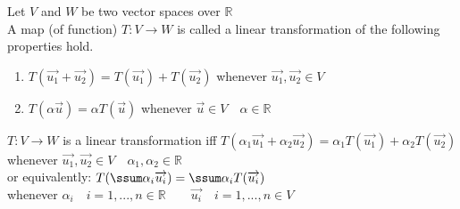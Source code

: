 \documentclass[12pt]{article}
\renewcommand{\v}[1]{\overrightarrow{#1}}
\newcommand{\real}[0]{\mathbb{R}}
\newenvironment{remark}{\block[Remark]}{\endblock}
\newenvironment{definition}{\block[Definition]}{\endblock}
\begin{document}
\begin{definition}
	Let $V$ and $W$ be two vector spaces over $\real$ \\
	A map (of function) $T: V \rightarrow W$ is called a linear transformation of the following properties hold.
	
	\begin{enumerate}
		\item $T(\v{u_1} + \v{u_2}) = T(\v{u_1}) + T(\v{u_2})$ whenever $\v{u_1}, \v{u_2} \in V$
		
		\item $T(\alpha \v{u}) = \alpha T(\v{u})$ whenever $\v{u} \in V \quad \alpha \in \real$
	\end{enumerate}

\end{definition}

\begin{remark}
	$T : V  \rightarrow W$ is a linear transformation iff $T(\alpha_1 \v{u_1} + \alpha_2 \v{u_2}) = \alpha_1 T(\v{u_1}) + \alpha_2 T(\v{u_2})$ whenever $\v{u_1}, \v{u_2} \in V \quad \alpha_1, \alpha_2 \in \real$ \\
	or equivalently: $T(\ssum \alpha_i \v{u_i}) = \ssum \alpha_i T(\v{u_i})$ \\
	whenever $\alpha_i \quad i = 1, ..., n \in \real \qquad \v{u_i} \quad i = 1, ..., n \in V$
\end{remark}
\end{document}

